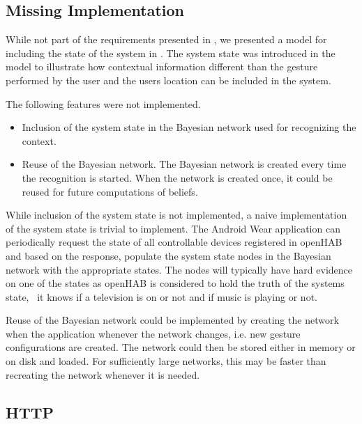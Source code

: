\subsection{Missing Implementation}

While not part of the requirements presented in , we presented a model for including the state of the system in . The system state was introduced in the model to illustrate how contextual information different than the gesture performed by the user and the users location can be included in the system.

The following features were not implemented.

\begin{itemize}
\item Inclusion of the system state in the Bayesian network used for recognizing the context.
\item Reuse of the Bayesian network. The Bayesian network is created every time the recognition is started. When the network is created once, it could be reused for future computations of beliefs.
\end{itemize}

While inclusion of the system state is not implemented, a naive implementation of the system state is trivial to implement. The Android Wear application can periodically request the state of all controllable devices registered in openHAB and based on the response, populate the system state nodes in the Bayesian network with the appropriate states. The nodes will typically have hard evidence on one of the states as openHAB is considered to hold the truth of the systems state, \eg~it knows if a television is on or not and if music is playing or not.

Reuse of the Bayesian network could be implemented by creating the network when the application whenever the network changes, i.e. new gesture configurations are created. The network could then be stored either in memory or on disk and loaded. For sufficiently large networks, this may be faster than recreating the network whenever it is needed.

\subsection{HTTP}

